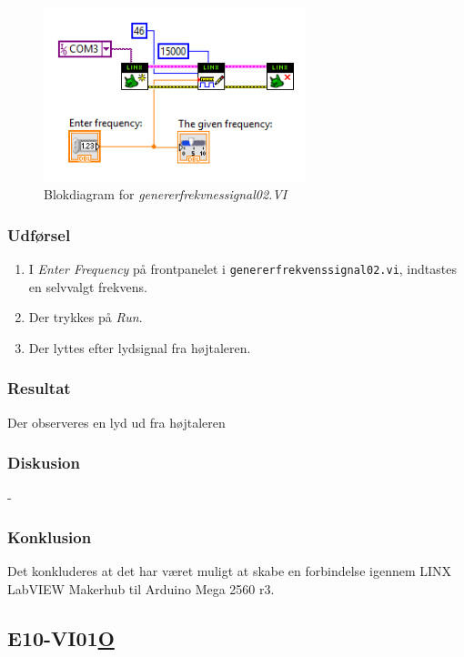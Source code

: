 \begin{figure}[htb]
			\centering
				\includegraphics[width=3in]{gf02}
				\caption{Blokdiagram for \textit{genererfrekvnessignal02.VI}}	
				\label{fig:gf02}
			\end{figure}
				
\subsubsection{Udførsel}

\begin{enumerate}
				\item I \textit{Enter Frequency} på frontpanelet i \texttt{genererfrekvenssignal02.vi}, indtastes en selvvalgt frekvens. 
				\item Der trykkes på \textit{Run}. 
				\item Der lyttes efter lydsignal fra højtaleren.  
			\end{enumerate}

\subsubsection{Resultat}

Der observeres en lyd ud fra højtaleren

\subsubsection{Diskusion}
-
\subsubsection{Konklusion}

Det konkluderes at det har været muligt at skabe en forbindelse  
igennem LINX LabVIEW Makerhub til Arduino Mega 2560 r3.



\subsection{E10-VI01\underline{O}}
